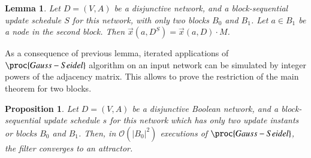 \documentclass[preprint,12pt]{elsarticle}
\newtheorem {lema}[teo]{Lemma}
\newtheorem{prop}{Proposition}
\begin{document}
\begin{lema}\label{l2}
Let $D=(V,A)$ be a disjunctive network, and a block-sequential update schedule $S$ for this network, with only two blocks $B_0$ and $B_1$. Let $a \in B_1$ be a node in the second block. 
Then $\vec{x}(a,D^S) =\vec{x}(a,D)\cdot M$.
\end{lema}

As a consequence of previous lemma, iterated applications of $\proc{Gauss-Seidel}$ algorithm on an input network can be simulated by integer powers of the adjacency matrix. This allows to prove the restriction of the main theorem for two blocks.

\begin{prop}\label{l6}
Let $D=(V,A)$ be a disjunctive Boolean network, and a block-sequential update schedule $s$ for this network which has only two update instants or blocks $B_0$ and $B_1$. Then, in $\mathcal{O}(|B_0|^2)$ executions of $\proc{Gauss-Seidel}$, the filter converges to an attractor.
\end{prop}
\end{document}
